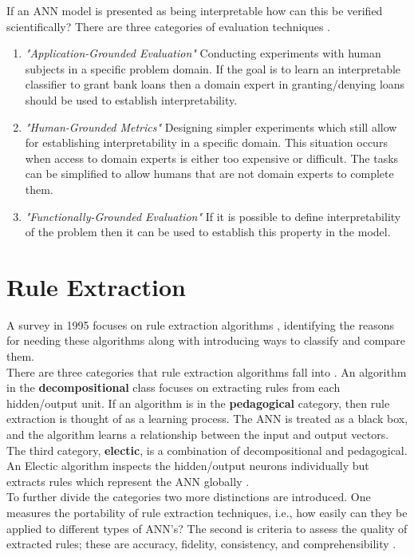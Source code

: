 If an ANN model is presented as being interpretable how can this be verified scientifically? There are three categories of evaluation techniques \cite{doshi2017towards}.
\begin{enumerate}
	\item \textit{"Application-Grounded Evaluation"} Conducting experiments with human subjects in a specific problem domain. If the goal is to learn an interpretable classifier to grant bank loans then a domain expert in granting/denying loans should be used to establish interpretability.
	
	\item \textit{"Human-Grounded Metrics"} Designing simpler experiments which still allow for establishing interpretability in a specific domain. This situation occurs when access to domain experts is either too expensive or difficult. The tasks can be simplified to allow humans that are not domain experts to complete them.
	
	\item \textit{"Functionally-Grounded Evaluation"} If it is possible to define interpretability of the problem then it can be used to establish this property in the model.
\end{enumerate}


\section{Rule Extraction}

A survey in 1995 focuses on rule extraction algorithms \cite{andrews1995survey}, identifying the reasons for needing these algorithms along with introducing ways to classify and compare them.\\

There are three categories that rule extraction algorithms fall into \cite{andrews1995survey}. An algorithm in the \textbf{decompositional} class focuses on extracting rules from each hidden/output unit. If an algorithm is in the \textbf{pedagogical} category, then rule extraction is thought of as a learning process. The ANN is treated as a black box, and the algorithm learns a relationship between the input and output vectors. The third category, \textbf{electic}, is a combination of decompositional and pedagogical. An Electic algorithm inspects the hidden/output neurons individually but extracts rules which represent the ANN globally \cite{tickle1998truth}.\\

To further divide the categories two more distinctions are introduced. One measures the portability of rule extraction techniques, i.e., how easily can they be applied to different types of ANN's? The second is criteria to assess the quality of extracted rules; these are accuracy, fidelity, consistency, and comprehensibility \cite{andrews1995survey}.

